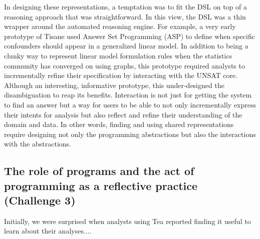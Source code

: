 In designing these representations, a temptation was to fit the DSL on top of a
reasoning approach that was straightforward. In this view, the DSL was a thin
wrapper around the automated reasoning engine. For example, a very early
prototype of Tisane used Answer Set Programming (ASP) to define when specific
confounders should appear in a generalized linear model. In addition to being a
clunky way to represent linear model formulation rules when the statistics
community has converged on using graphs, this prototype required analysts to
incrementally refine their specification by interacting with the UNSAT core.
Although an interesting, informative prototype, this under-designed the
disambiguation to reap its benefits. Interaction is not just for getting the
system to find an answer but a way for users to be able to not only
incrementally express their intents for analysis but also reflect and refine
their understanding of the domain and data. In other words, finding and using
shared representations require designing not only the programming abstractions
but also the interactions with the abstractions. 




\subsection{The role of programs and the act of programming as a reflective practice (Challenge 3)}


Initially, we were surprised when analysts using Tea reported finding it useful
to learn about their analyses....

